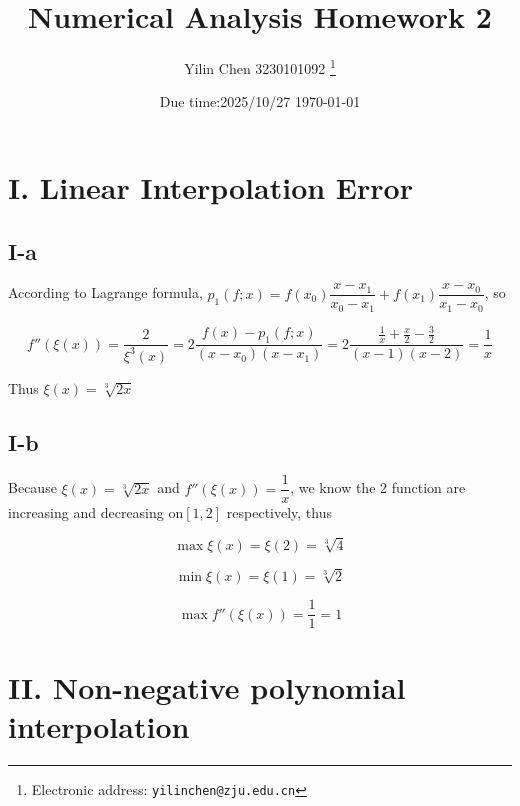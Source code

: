 \documentclass[a4paper]{article}
\begin{document}
\title{Numerical Analysis Homework 2}

\author{Yilin Chen 3230101092
  \thanks{Electronic address: \texttt{yilinchen@zju.edu.cn}}}


\date{Due time:2025/10/27 \today}

\maketitle






\section*{I. Linear Interpolation Error}

\subsection*{I-a}

According to Lagrange formula, $p_1(f;x) = f(x_0)\dfrac{x-x_1}{x_0 - x_1} + f(x_1)\dfrac{x-x_0}{x_1 - x_0}$, so 

$$f''(\xi(x)) = \dfrac2{\xi^3(x)} = 2\dfrac{f(x) - p_1(f;x)}{(x - x_0)(x - x_1)} = 2\dfrac{\frac1x + \frac{x}2- \frac32}{(x - 1)(x - 2)} = \dfrac{1}{x}$$

Thus $\xi(x) = \sqrt[3]{2x}$


\subsection*{I-b}

Because $\xi(x) = \sqrt[3]{2x}$ and $f''(\xi(x)) = \dfrac1x$, we know the 2 function are increasing and decreasing on$[1, 2]$ respectively, thus

$$\max\xi(x) = \xi(2) = \sqrt[3]{4}$$

$$\min\xi(x) = \xi(1) = \sqrt[3]{2}$$

$$\max f''(\xi(x)) = \dfrac11 = 1$$

\section*{II. Non-negative polynomial interpolation}
\end{document}
